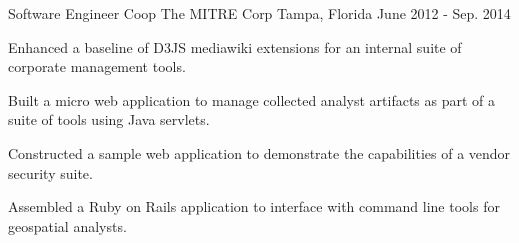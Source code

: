 \begin{cventries}
  \cventry
    {Software Engineer Coop} %
    {The MITRE Corp} %
    {Tampa, Florida} %
    {June 2012 - Sep. 2014} %
    {
      \begin{cvitems} %
        \item {Enhanced a baseline of D3JS mediawiki extensions for an internal suite of corporate management tools.}
        \item {Built a micro web application to manage collected analyst artifacts as part of a suite of tools using Java servlets.}
        \item {Constructed a sample web application to demonstrate the capabilities of a vendor security suite.}
        \item {Assembled a Ruby on Rails application to interface with command line tools for geospatial analysts.}
      \end{cvitems}
    }

\end{cventries}
